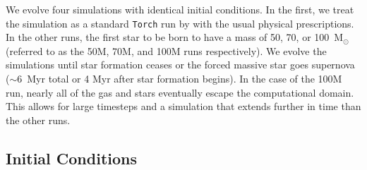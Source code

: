 \documentclass[twoside]{drexel-thesis}
\begin{document}
\begin{thesis}
We evolve four simulations with identical initial conditions. In the first, we treat the simulation as a standard \texttt{Torch} run by with the usual physical prescriptions. In the other runs, the first star to be born to have a mass of 50, 70, or 100~M$_\odot$ (referred to as the 50M, 70M, and 100M runs respectively). 
We evolve the simulations until star formation ceases or the forced massive star goes supernova ($\sim6$~Myr total or 4 Myr after star formation begins). In the case of the 100M run, nearly all of the gas and stars eventually escape the computational domain. This allows for large timesteps and a simulation that extends further in time than the other runs.

\subsection{Initial Conditions}


\end{thesis}
\end{document}
